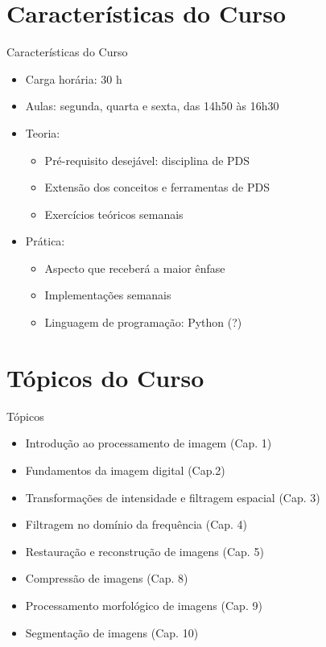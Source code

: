    \section[ slide = false ]{Características do Curso}
      \begin{slide}[toc=]{Características do Curso}
         \begin{itemize}[type=1]
            \item Carga horária: 30 h%
            \item Aulas: segunda, quarta e sexta, das 14h50 às 16h30%
            \item Teoria:
            \begin{itemize}
               \item Pré-requisito desejável: disciplina de PDS
               \item Extensão dos conceitos e ferramentas de PDS
               \item Exercícios teóricos semanais %
            \end{itemize}
            \item Prática:
            \begin{itemize}
               \item Aspecto que receberá a maior ênfase
               \item Implementações semanais 
               \item Linguagem de programação: Python (?)
            \end{itemize}
         \end{itemize}         
      \end{slide}

   \section[ slide = false ]{Tópicos do Curso}
   \begin{slide}[toc=]{Tópicos}
      \begin{itemize}[type=1]
         \item Introdução ao processamento de imagem (Cap. 1)
         \item Fundamentos da imagem digital (Cap.2)
         \item Transformações de intensidade e filtragem espacial (Cap. 3)
         \item Filtragem no domínio da frequência (Cap. 4) 
         \item Restauração e reconstrução de imagens (Cap. 5)
         \item Compressão de imagens (Cap. 8)
         \item Processamento morfológico de imagens (Cap. 9)
         \item Segmentação de imagens (Cap. 10)
      \end{itemize}
   \end{slide}

